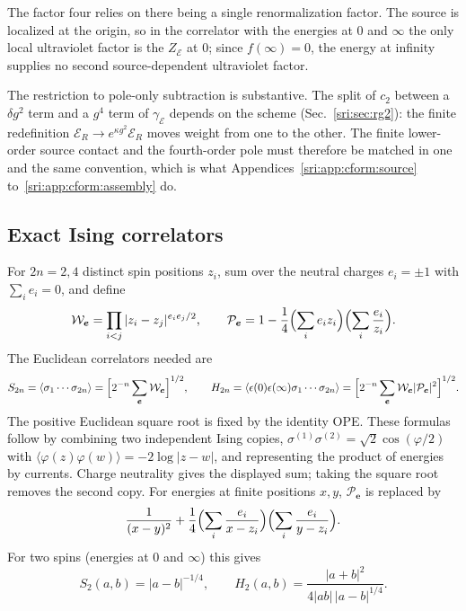The factor four relies on there being a single renormalization factor. The source is localized at the origin, so in
the correlator with the energies at $0$ and $\infty$ the only local ultraviolet factor is the $Z_{\mathcal E}$ at $0$;
since $f(\infty)=0$, the energy at infinity supplies no second source-dependent ultraviolet factor.

The restriction to pole-only subtraction is substantive. The split of $c_2$ between a $\delta g^2$ term and a $g^4$
term of $\gamma_{\mathcal E}$ depends on the scheme (Sec.~\ref{sri:sec:rg2}): the finite redefinition
$\mathcal E_R\to e^{\kappa g^2}\mathcal E_R$ moves weight from one to the other. The finite lower-order source contact
and the fourth-order pole must therefore be matched in one and the same convention, which is what
Appendices~\ref{sri:app:cform:source} to~\ref{sri:app:cform:assembly} do.

\subsection{Exact Ising correlators}\label{sri:app:cform:correlators}
For $2n=2,4$ distinct spin positions $z_i$, sum over the neutral charges $e_i=\pm1$ with $\sum_ie_i=0$, and define
\begin{equation}
 \mathcal W_{\boldsymbol e}=\prod_{i<j}|z_i-z_j|^{e_ie_j/2},\qquad
 \mathcal P_{\boldsymbol e}=1-\frac14\Bigl(\sum_ie_iz_i\Bigr)\Bigl(\sum_i\frac{e_i}{z_i}\Bigr).
\end{equation}
The Euclidean correlators needed are~\cite{sri:Ardonne:2010zz}
\begin{equation}
 S_{2n}=\langle\sigma_1\cdots\sigma_{2n}\rangle=\Bigl[2^{-n}\sum_{\boldsymbol e}\mathcal W_{\boldsymbol e}\Bigr]^{1/2},\qquad
 H_{2n}=\langle\epsilon(0)\epsilon(\infty)\sigma_1\cdots\sigma_{2n}\rangle
 =\Bigl[2^{-n}\sum_{\boldsymbol e}\mathcal W_{\boldsymbol e}|\mathcal P_{\boldsymbol e}|^2\Bigr]^{1/2}.
 \label{sri:eq:cform:neutral}
\end{equation}
The positive Euclidean square root is fixed by the identity OPE. These formulas follow by combining two independent
Ising copies, $\sigma^{(1)}\sigma^{(2)}=\sqrt2\cos(\varphi/2)$ with $\langle\varphi(z)\varphi(w)\rangle=-2\log|z-w|$,
and representing the product of energies by currents. Charge neutrality gives the displayed sum; taking the square
root removes the second copy. For energies at finite positions $x,y$, $\mathcal P_{\boldsymbol e}$ is replaced by
\begin{equation}
 \frac1{(x-y)^2}+\frac14\Bigl(\sum_i\frac{e_i}{x-z_i}\Bigr)\Bigl(\sum_i\frac{e_i}{y-z_i}\Bigr).
 \label{sri:eq:cform:finiteenergy}
\end{equation}
For two spins (energies at $0$ and $\infty$) this gives
\begin{equation}
 S_2(a,b)=|a-b|^{-1/4},\qquad H_2(a,b)=\frac{|a+b|^2}{4|ab|\,|a-b|^{1/4}}.
 \label{sri:eq:cform:twospin}
\end{equation}

